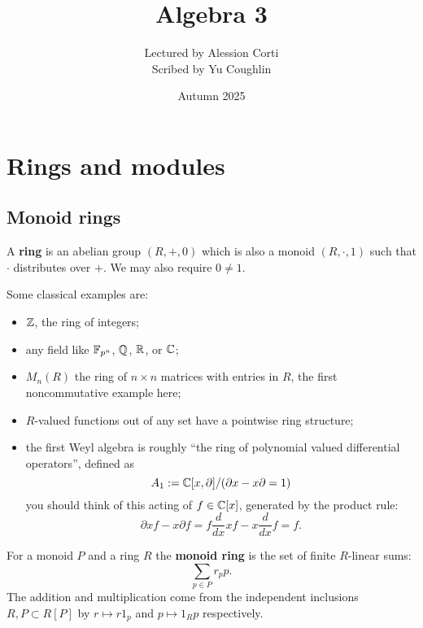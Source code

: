 \documentclass{article}
\begin{document}
\title{Algebra 3}
\author{Lectured by Alession Corti \\
Scribed by Yu Coughlin}
\date{Autumn 2025}

\maketitle

\tableofcontents

\section{Rings and modules}

\subsection{Monoid rings}

\begin{definition}
    A \textbf{ring} is an abelian group $(R,+,0)$ which is also a monoid $(R,\cdot,1)$ such that $\cdot$ distributes over $+$. We may also require $0\neq 1$.
\end{definition}
Some classical examples are: \begin{itemize}
    \item $\mathbb{Z}$, the ring of integers;
    \item any field like $\mathbb{F}_{p^n}$, $\mathbb{Q}$, $\mathbb{R}$, or $\mathbb{C}$;
    \item $M_n(R)$ the ring of $n\times n$ matrices with entries in $R$, the first noncommutative example here;
    \item $R$-valued functions out of any set have a pointwise ring structure;
    \item the first Weyl algebra is roughly ``the ring of polynomial valued differential operators'', defined as \[
        A_1 := \mathbb{C}[x,\partial] / (\partial x - x \partial = 1)
    \] you should think of this acting of $f\in \mathbb{C}[x]$, generated by the product rule: \[
    \partial xf - x\partial f = f\frac{d}{dx}xf - x\frac{d}{dx}f = f.
    \]
\end{itemize}

\begin{definition}
    For a monoid $P$ and a ring $R$ the \textbf{monoid ring} is the set of finite $R$-linear sums:\[
    \sum_{p\in P}r_p p.
    \] The addition and multiplication come from the independent inclusions $R,P\subset R[P]$ by $r\mapsto r1_p$ and $p \mapsto 1_Rp$ respectively.
\end{definition}
\end{document}
